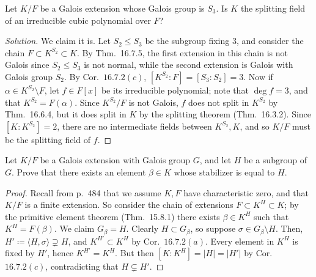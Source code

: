 \documentclass[12pt]{article}
\theoremstyle{remark}
\begin{document}
\setcounter{subsubsection}{5}
\begin{problem}
  Let $K/F$ be a Galois extension whose Galois group is $S_3$. Is $K$ the splitting field of an irreducible cubic polynomial over $F$?
\end{problem}
\begin{proof}[Solution]
  We claim it is. Let $S_2 \leqslant S_3$ be the subgroup fixing $3$, and consider the chain $F \subset K^{S_2} \subset K$. By Thm.~16.7.5, the first extension in this chain is not Galois since $S_2 \leqslant S_3$ is not normal, while the second extension is Galois with Galois group $S_2$. By Cor.~$16.7.2(c)$, $[K^{S_2} : F] = [S_3 : S_2] = 3$. Now if $\alpha \in K^{S_2} \setminus F$, let $f \in F[x]$ be its irreducible polynomial; note that $\deg f = 3$, and that $K^{S_2} = F(\alpha)$. Since $K^{S_2}/F$ is not Galois, $f$ does not split in $K^{S_2}$ by Thm.~16.6.4, but it does split in $K$ by the splitting theorem (Thm.~16.3.2). Since $[K : K^{S_2}] = 2$, there are no intermediate fields between $K^{S_2},K$, and so $K/F$ must be the splitting field of $f$.
\end{proof}

\setcounter{subsubsection}{9}
\begin{problem}
  Let $K/F$ be a Galois extension with Galois group $G$, and let $H$ be a subgroup of $G$. Prove that there exists an element $\beta \in K$ whose stabilizer is equal to $H$.
\end{problem}
\begin{proof}
  Recall from p.~484 that we assume $K,F$ have characteristic zero, and that $K/F$ is a finite extension. So consider the chain of extensions $F \subset K^H \subset K$; by the primitive element theorem (Thm.~15.8.1) there exists $\beta \in K^H$ such that $K^H = F(\beta)$. We claim $G_\beta = H$. Clearly $H \subset G_\beta$, so suppose $\sigma \in G_\beta \setminus H$. Then, $H' \coloneqq \langle H,\sigma \rangle \supsetneq H$, and $K^{H'} \subset K^H$ by Cor.~$16.7.2(a)$. Every element in $K^H$ is fixed by $H'$, hence $K^{H'} = K^H$. But then $[K : K^H] = \lvert H \rvert = \lvert H' \rvert$ by Cor.~$16.7.2(c)$, contradicting that $H \subsetneq H'$.
\end{proof}
\end{document}
